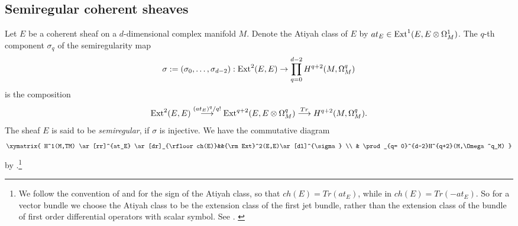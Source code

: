 \documentclass[12pt]{amsart}
\numberwithin{equation}{subsection}
\theoremstyle{plain}
\theoremstyle{definition}
\newcommand{\LongRightArrowOf}[1]{\stackrel{#1}{\longrightarrow}}
\newcommand{\Ext}{{\rm Ext}}
\newcommand{\Contract}{\rfloor}
\begin{document}
\subsection{Semiregular coherent sheaves}
\label{sec-semiregular-sheaves}
Let $E$ be a coherent sheaf on a $d$-dimensional complex manifold $M$. Denote the Atiyah class of $E$ by  $at_E\in \Ext^1(E,E\otimes\Omega^1_M)$. 
The $q$-th component $\sigma_q$ of the semiregularity map 
\begin{equation}
\label{eq-semiregularity-map}
\sigma:=(\sigma_0, \dots,\sigma_{d-2}):\Ext^2(E,E)\rightarrow \prod_{q= 0}^{d-2}H^{q+2}(M,\Omega^q_M)
\end{equation}
is the composition
\[
\Ext^2(E,E)\LongRightArrowOf{(at_E)^q/q!}\Ext^{q+2}(E,E\otimes\Omega^q_M)\LongRightArrowOf{Tr}H^{q+2}(M,\Omega^q_M).
\]
The sheaf $E$ is said to be {\em semiregular}, if $\sigma$ is injective.
We have the commutative diagram
\begin{equation}
\label{eq-diagram-semi-regularity}
\xymatrix{
H^1(M,TM) \ar[rr]^{at_E} \ar[dr]_{\Contract ch(E)}&&\Ext^2(E,E)\ar[dl]^{\sigma}
\\
&
\prod_{q= 0}^{d-2}H^{q+2}(M,\Omega^q_M)
}
\end{equation}
by \cite[Cor. 4.3]{buchweitz-flenner}.\footnote{We follow the convention of \cite{toda} and \cite{huybrechts-lehn} for the sign of the Atiyah class, so that $ch(E)=Tr(at_E)$, while in \cite{buchweitz-flenner} $ch(E)=Tr(-at_E)$. So for a vector bundle we choose the Atiyah class to be the extension class of the first jet bundle, rather than the extension class of the bundle of first order differential operators with scalar symbol. See \cite[Theorem 5]{atiyah}. \label{footnote-atiyah-class}}

% 
\end{document}
